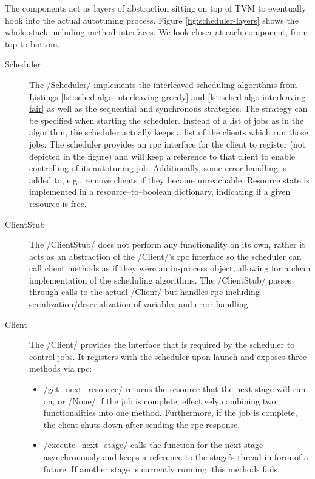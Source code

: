 The components act as layers of abstraction sitting on top of TVM to eventually hook into the actual autotuning process. Figure \ref{fig:scheduler-layers} shows the whole stack including method interfaces. We look closer at each component, from top to bottom.
\begin{description}
	\item[Scheduler] The \pythoninline/Scheduler/ implements the interleaved scheduling algorithms from Listings \ref{lst:sched-algo-interleaving-greedy} and  \ref{lst:sched-algo-interleaving-fair} as well as the sequential and synchronous strategies. The strategy can be specified when starting the scheduler. Instead of a list of jobs as in the algorithm, the scheduler actually keeps a list of the clients which run those jobs. The scheduler provides an \gls{rpc} interface for the client to register (not depicted in the figure) and will keep a reference to that client to enable controlling of its autotuning job. Additionally, some error handling is added to, e.g., remove clients if they become unreachable. Resource state is implemented in a resource--to--boolean dictionary, indicating if a given resource is free.
	\item[ClientStub] The \pythoninline/ClientStub/ does not perform any functionality on its own, rather it acts as an abstraction of the \pythoninline/Client/'s \gls{rpc} interface so the scheduler can call client methods as if they were an in-process object, allowing for a clean implementation of the scheduling algorithms. The \pythoninline/ClientStub/ passes through calls to the actual \pythoninline/Client/ but handles \gls{rpc} including serialization/deserialization of variables and error handling.
	\item[Client] The \pythoninline/Client/ provides the interface that is required by the scheduler to control jobs. It registers with the scheduler upon launch and exposes three methods via \gls{rpc}:
	\begin{itemize}
		\item \pythoninline/get_next_resource/ returns the resource that the next stage will run on, or \pythoninline/None/ if the job is complete, effectively combining two functionalities into one method. Furthermore, if the job is complete, the client shuts down after sending the \gls{rpc} response.
		\item \pythoninline/execute_next_stage/ calls the function for the next stage asynchronously and keeps a reference to the stage's thread in form of a future. If another stage is currently running, this methods fails.

\end{itemize}
\end{description}
